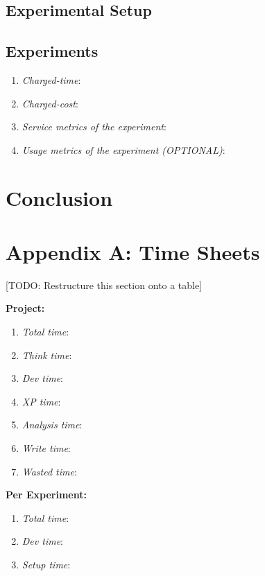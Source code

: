 \documentclass[a4paper]{article}
\begin{document}
\subsection{Experimental Setup}

\subsection{Experiments}

\begin{enumerate}
  \item{\emph{Charged-time}: }
  \item{\emph{Charged-cost}: }
  \item{\emph{Service metrics of the experiment}: }
  \item{\emph{Usage metrics of the experiment (OPTIONAL)}: }
\end{enumerate}

\section{Conclusion}




\section*{Appendix A: Time Sheets}

[TODO: Restructure this section onto a table]

\textbf{Project:}
\begin{enumerate}
  \item{\emph{Total time}: }
  \item{\emph{Think time}: }
  \item{\emph{Dev time}: }
  \item{\emph{XP time}: }
  \item{\emph{Analysis time}: }
  \item{\emph{Write time}: }
  \item{\emph{Wasted time}: }
\end{enumerate}

\textbf{Per Experiment:}
\begin{enumerate}
  \item{\emph{Total time}: }
  \item{\emph{Dev time}: }
  \item{\emph{Setup time}: }
\end{enumerate}
\end{document}
